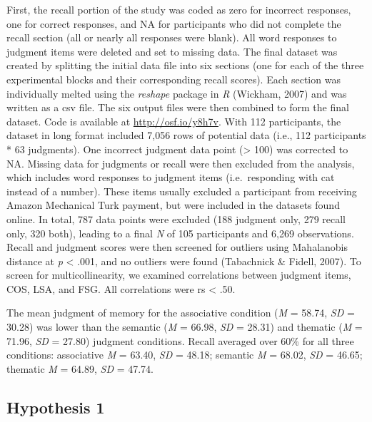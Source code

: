 \documentclass[english,man]{apa6}
\theoremstyle{definition}
\theoremstyle{definition}
\theoremstyle{remark}
\begin{document}
First, the recall portion of the study was coded as zero for incorrect
responses, one for correct responses, and NA for participants who did
not complete the recall section (all or nearly all responses were
blank). All word responses to judgment items were deleted and set to
missing data. The final dataset was created by splitting the initial
data file into six sections (one for each of the three experimental
blocks and their corresponding recall scores). Each section was
individually melted using the \emph{reshape} package in \emph{R}
(Wickham, 2007) and was written as a csv file. The six output files were
then combined to form the final dataset. Code is available at
\url{http://osf.io/y8h7v}. With 112 participants, the dataset in long
format included 7,056 rows of potential data (i.e., 112 participants *
63 judgments). One incorrect judgment data point (\textgreater{} 100)
was corrected to NA. Missing data for judgments or recall were then
excluded from the analysis, which includes word responses to judgment
items (i.e.~responding with cat instead of a number). These items
usually excluded a participant from receiving Amazon Mechanical Turk
payment, but were included in the datasets found online. In total, 787
data points were excluded (188 judgment only, 279 recall only, 320
both), leading to a final \emph{N} of 105 participants and 6,269
observations. Recall and judgment scores were then screened for outliers
using Mahalanobis distance at \emph{p} \textless{} .001, and no outliers
were found (Tabachnick \& Fidell, 2007). To screen for
multicollinearity, we examined correlations between judgment items, COS,
LSA, and FSG. All correlations were rs \textless{} .50.

The mean judgment of memory for the associative condition (\emph{M} =
58.74, \emph{SD} = 30.28) was lower than the semantic (\emph{M} = 66.98,
\emph{SD} = 28.31) and thematic (\emph{M} = 71.96, \emph{SD} = 27.80)
judgment conditions. Recall averaged over 60\% for all three conditions:
associative \emph{M} = 63.40, \emph{SD} = 48.18; semantic \emph{M} =
68.02, \emph{SD} = 46.65; thematic \emph{M} = 64.89, \emph{SD} = 47.74.

\subsection{Hypothesis 1}\label{hypothesis-1}
\end{document}
